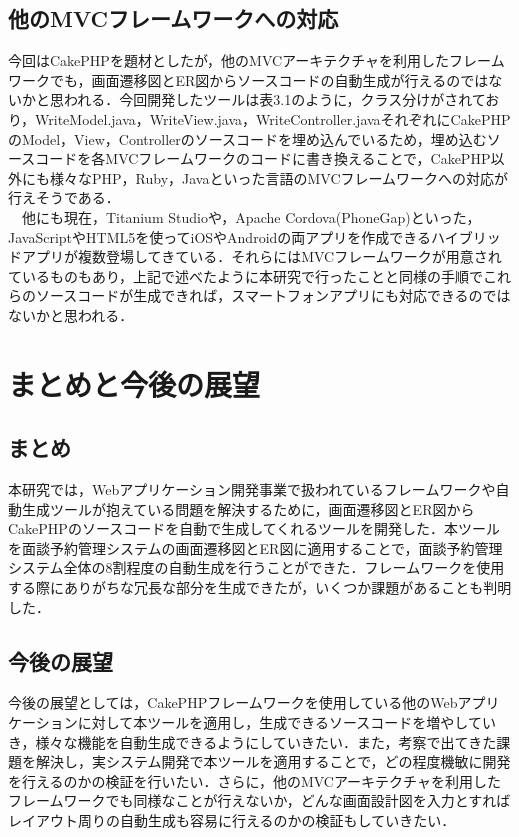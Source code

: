 \documentclass{funthesis}
\begin{document}
\section{他のMVCフレームワークへの対応}
今回はCakePHPを題材としたが，他のMVCアーキテクチャを利用したフレームワークでも，画面遷移図とER図からソースコードの自動生成が行えるのではないかと思われる．今回開発したツールは表3.1のように，クラス分けがされており，WriteModel.java，WriteView.java，WriteController.javaそれぞれにCakePHPのModel，View，Controllerのソースコードを埋め込んでいるため，埋め込むソースコードを各MVCフレームワークのコードに書き換えることで，CakePHP以外にも様々なPHP，Ruby，Javaといった言語のMVCフレームワークへの対応が行えそうである．\\
　他にも現在，Titanium Studioや，Apache Cordova(PhoneGap)といった，JavaScriptやHTML5を使ってiOSやAndroidの両アプリを作成できるハイブリッドアプリが複数登場してきている．それらにはMVCフレームワークが用意されているものもあり，上記で述べたように本研究で行ったことと同様の手順でこれらのソースコードが生成できれば，スマートフォンアプリにも対応できるのではないかと思われる．


\chapter{まとめと今後の展望}

\section{まとめ}
本研究では，Webアプリケーション開発事業で扱われているフレームワークや自動生成ツールが抱えている問題を解決するために，画面遷移図とER図からCakePHPのソースコードを自動で生成してくれるツールを開発した．本ツールを面談予約管理システムの画面遷移図とER図に適用することで，面談予約管理システム全体の8割程度の自動生成を行うことができた．フレームワークを使用する際にありがちな冗長な部分を生成できたが，いくつか課題があることも判明した．

\section{今後の展望}
今後の展望としては，CakePHPフレームワークを使用している他のWebアプリケーションに対して本ツールを適用し，生成できるソースコードを増やしていき，様々な機能を自動生成できるようにしていきたい．また，考察で出てきた課題を解決し，実システム開発で本ツールを適用することで，どの程度機敏に開発を行えるのかの検証を行いたい．さらに，他のMVCアーキテクチャを利用したフレームワークでも同様なことが行えないか，どんな画面設計図を入力とすればレイアウト周りの自動生成も容易に行えるのかの検証もしていきたい．
\end{document}
